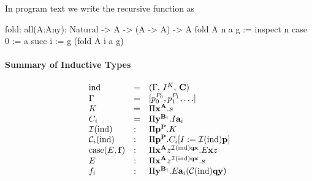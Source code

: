\begin{description}
  In program text we write the recursive function as
  \begin{alba}
    fold: all(A:Any): Natural -> A -> (A -> A) -> A
    fold A n a g :=
       inspect n case
          0 := a
          succ i := g (fold A i a g)
  \end{alba}
\end{description}



\paragraph{Summary of Inductive Types}

$$
\begin{array}{lll}
    \ind
    &=& (\Gamma,\, I^K,\, \vec{C})

    \\

    \Gamma
    &=& [p_0^{P_0}, p_1^{P_1}, \ldots]

    \\

    K
    &=& \Pi \vec{x}^\vec{A}. s

    \\

    C_i
    &=&
    \Pi
        \vec{y}^{\vec{B}_i}
        .
        I \vec{a}_i

    \\

    \Inductive (\ind)
    &:& \Pi \vec{p}^\vec{P}. K

    \\

    \Constructor_i (\ind)
    &:& \Pi \vec{p}^\vec{P}. C_i[I := \Inductive(\ind) \vec{p}]

    \\

    \case(E, \vec{f})
    &:&
    \Pi
        \vec{x}^\vec{A}
        z^{\Inductive (\ind) \vec{q} \vec{x}}
    .
    E \vec{x} z

    \\

    E
    &:&
    \Pi
        \vec{x}^\vec{A}
        z^{\Inductive (\ind) \vec{q} \vec{x}}
    .
    s

    \\

    f_i
    &:&
    \Pi
        \vec{y}^{\vec{B}_i}
        .
        E
            \vec{a}_i
            (\Constructor(\ind) \vec{q} \vec{y})
\end{array}
$$


